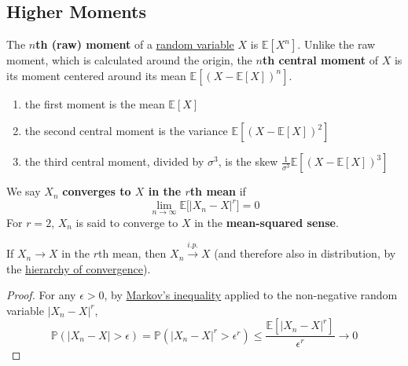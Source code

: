 \subsection{Higher Moments} 

  \begin{definition}[Moment]
    \label{def:moment}
    The \textbf{$n$th (raw) moment} of a \hyperref[def:random-variable]{random variable} $X$ is $\mathbb{E}[X^n]$. Unlike the raw moment, which is calculated around the origin, the \textbf{$n$th central moment} of $X$ is its moment centered around its mean $\mathbb{E}[(X - \mathbb{E}[X])^n]$. 
    \begin{enumerate}
      \item the first moment is the mean $\mathbb{E}[X]$
      \item the second central moment is the variance $\mathbb{E}[(X - \mathbb{E}[X])^2]$ 
      \item the third central moment, divided by $\sigma^3$, is the skew $\frac{1}{\sigma^3} \mathbb{E}[(X - \mathbb{E}[X])^3]$ 
    \end{enumerate}
  \end{definition}

  \begin{definition}
    \label{def:convergence-in-rth-mean}
    We say $X_n$ \textbf{converges to $X$ in the $r$th mean} if 
    \begin{equation}
      \lim_{n \rightarrow \infty} \mathbb{E} \big[ |X_n - X|^r \big] = 0
    \end{equation}
    For $r = 2$, $X_n$ is said to converge to $X$ in the \textbf{mean-squared sense}. 
  \end{definition}

  \begin{theorem}
    \label{thm:rth-mean-implies-in-probability}
    If $X_n \to X$ in the $r$th mean, then $X_n \xrightarrow{i.p.} X$ (and therefore also in distribution, by the \hyperref[thm:hierarchy-of-convergence]{hierarchy of convergence}). 
  \end{theorem}
  \begin{proof}
    For any $\epsilon > 0$, by \hyperref[thm:markovs-inequality]{Markov's inequality} applied to the non-negative random variable $|X_n - X|^r$, 
    \begin{equation}
      \mathbb{P}(|X_n - X| > \epsilon) = \mathbb{P}(|X_n - X|^r > \epsilon^r) \leq \frac{\mathbb{E}[|X_n - X|^r]}{\epsilon^r} \to 0
    \end{equation}
  \end{proof}

